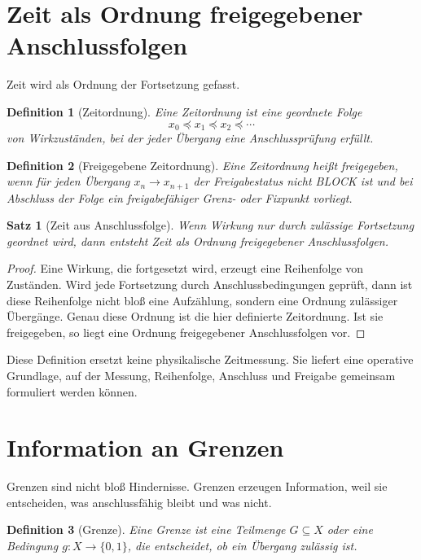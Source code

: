 \documentclass[11pt,a4paper,oneside]{scrartcl}
\theoremstyle{qikstyle}
\newtheorem{definition}{Definition}[section]
\newtheorem{satz}{Satz}[section]
\begin{document}
\section{Zeit als Ordnung freigegebener Anschlussfolgen}

Zeit wird als Ordnung der Fortsetzung gefasst.

\begin{definition}[Zeitordnung]
Eine Zeitordnung ist eine geordnete Folge
\[
x_0 \preceq x_1 \preceq x_2 \preceq \cdots
\]
von Wirkzuständen, bei der jeder Übergang eine Anschlussprüfung erfüllt.
\end{definition}

\begin{definition}[Freigegebene Zeitordnung]
Eine Zeitordnung heißt freigegeben, wenn für jeden Übergang \(x_n\to x_{n+1}\) der Freigabestatus nicht BLOCK ist und bei Abschluss der Folge ein freigabefähiger Grenz- oder Fixpunkt vorliegt.
\end{definition}

\begin{satz}[Zeit aus Anschlussfolge]
Wenn Wirkung nur durch zulässige Fortsetzung geordnet wird, dann entsteht Zeit als Ordnung freigegebener Anschlussfolgen.
\end{satz}

\begin{proof}
Eine Wirkung, die fortgesetzt wird, erzeugt eine Reihenfolge von Zuständen. Wird jede Fortsetzung durch Anschlussbedingungen geprüft, dann ist diese Reihenfolge nicht bloß eine Aufzählung, sondern eine Ordnung zulässiger Übergänge. Genau diese Ordnung ist die hier definierte Zeitordnung. Ist sie freigegeben, so liegt eine Ordnung freigegebener Anschlussfolgen vor.
\end{proof}

Diese Definition ersetzt keine physikalische Zeitmessung. Sie liefert eine operative Grundlage, auf der Messung, Reihenfolge, Anschluss und Freigabe gemeinsam formuliert werden können.
\newpage

\section{Information an Grenzen}

Grenzen sind nicht bloß Hindernisse. Grenzen erzeugen Information, weil sie entscheiden, was anschlussfähig bleibt und was nicht.

\begin{definition}[Grenze]
Eine Grenze ist eine Teilmenge \(G\subseteq X\) oder eine Bedingung \(g:X\to\{0,1\}\), die entscheidet, ob ein Übergang zulässig ist.
\end{definition}
\end{document}

